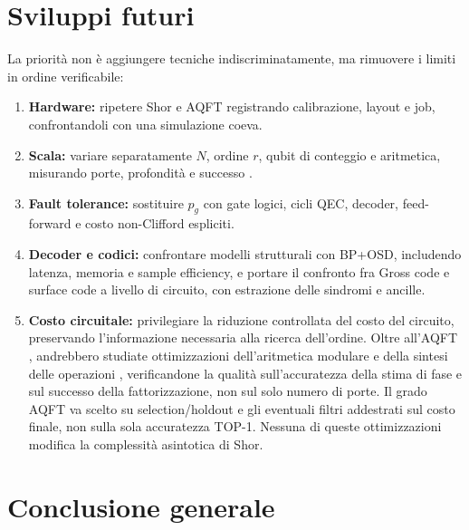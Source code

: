 \section{Sviluppi futuri}\label{sec:finale_6_4}

La priorità non è aggiungere tecniche indiscriminatamente, ma rimuovere i limiti in ordine verificabile:

\begin{enumerate}
\item {}\label{sec:finale_6_4_1}\textbf{Hardware:} ripetere Shor e AQFT registrando calibrazione, layout e job, confrontandoli con una simulazione coeva.
\item {}\label{sec:finale_6_4_2}\textbf{Scala:} variare separatamente $N$, ordine $r$, qubit di conteggio e aritmetica, misurando porte, profondità e successo \cite{chevignard2025,gidney2021,shuklaqpe2026}.
\item {}\label{sec:finale_6_4_3}\textbf{Fault tolerance:} sostituire $p_g$ con gate logici, cicli QEC, decoder, feed-forward e costo non-Clifford espliciti.
\item {}\label{sec:finale_6_4_4}\textbf{Decoder e codici:} confrontare modelli strutturali con BP+OSD, includendo latenza, memoria e sample efficiency, e portare il confronto fra Gross code e surface code a livello di circuito, con estrazione delle sindromi e ancille.
\item {}\label{sec:finale_6_4_5}\textbf{Costo circuitale:} privilegiare la riduzione controllata del costo del circuito, preservando l'informazione necessaria alla ricerca dell'ordine. Oltre all'AQFT \cite{barencoAQFT1996}, andrebbero studiate ottimizzazioni dell'aritmetica modulare e della sintesi delle operazioni \cite{gidney2021}, verificandone la qualità sull'accuratezza della stima di fase e sul successo della fattorizzazione, non sul solo numero di porte. Il grado AQFT va scelto su selection/holdout e gli eventuali filtri addestrati sul costo finale, non sulla sola accuratezza TOP-1. Nessuna di queste ottimizzazioni modifica la complessità asintotica di Shor.
\end{enumerate}

\label{tab:finale_6_2}

\section{Conclusione generale}\label{sec:finale_6_5}

